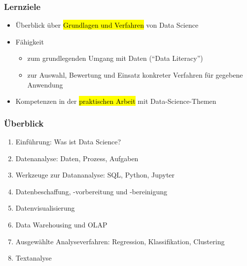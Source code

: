   
  \begin{frame}
  
    \frametitle{Lernziele}
  
  \begin{itemize}
  \item Überblick über \hl{Grundlagen und Verfahren} von Data Science
  \item Fähigkeit 
  \begin{itemize}
  \item zum grundlegenden Umgang mit Daten ("`Data Literacy"')
  \item zur Auswahl, Bewertung und Einsatz konkreter Verfahren für
    gegebene Anwendung 
  \end{itemize}
  \item Kompetenzen in der \hl{praktischen Arbeit} mit Data-Science-Themen 
\end{itemize}
  
  \end{frame}

  
  \begin{frame}
    \frametitle{Überblick}
  
    \begin{enumerate}
    \item<1-> Einführung: Was ist Data Science?
    \item<2-> Datenanalyse: Daten, Prozess, Aufgaben
    \item<3-> Werkzeuge zur Datananalyse: SQL, Python, Jupyter
    \item<4-> Datenbeschaffung, -vorbereitung und -bereinigung
    \item<5-> Datenvisualisierung
    \item<6-> Data Warehousing und OLAP
    \item<7-> Ausgewählte Analyseverfahren: Regression, Klassifikation, Clustering
    \item<8-> Textanalyse
   \end{enumerate}
  
  \end{frame}

  
